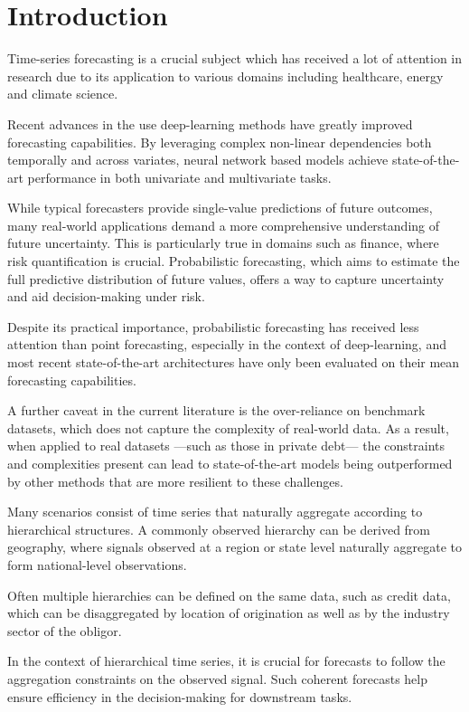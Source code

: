 \documentclass[letterpaper]{article}
\begin{document}
\section{Introduction}

Time-series forecasting is a crucial subject which has received a lot of attention in research due to its application to various domains including healthcare, energy and climate science.

Recent advances in the use deep-learning methods have greatly improved forecasting capabilities.
By leveraging complex non-linear dependencies both temporally and across variates, neural network based models achieve state-of-the-art performance in both univariate and multivariate tasks.

While typical forecasters provide single-value predictions of future outcomes, many real-world applications demand a more comprehensive understanding of future uncertainty. 
This is particularly true in domains such as finance, where risk quantification is crucial. 
Probabilistic forecasting, which aims to estimate the full predictive distribution of future values, offers a way to capture uncertainty and aid decision-making under risk.

Despite its practical importance, probabilistic forecasting has received less attention than point forecasting, 
especially in the context of deep-learning, and most recent state-of-the-art architectures have only been evaluated on their mean forecasting capabilities.

A further caveat in the current literature is the over-reliance on benchmark datasets, 
which does not capture the complexity of real-world data.
 As a result, when applied to real datasets ---such as those in private debt--- the constraints and complexities present can lead to state-of-the-art models being outperformed by other methods that are more resilient to these challenges. 

Many scenarios consist of time series that naturally aggregate according to hierarchical structures. 
A commonly observed hierarchy can be derived from geography, where signals observed at a region or state level naturally aggregate to form national-level observations.

Often multiple hierarchies can be defined on the same data, such as credit data, which can be disaggregated by location of origination as well as by the industry sector of the obligor.

In the context of hierarchical time series, it is crucial for forecasts to follow the aggregation constraints on the observed signal.
Such coherent forecasts help ensure efficiency in the decision-making for downstream tasks.
\end{document}
